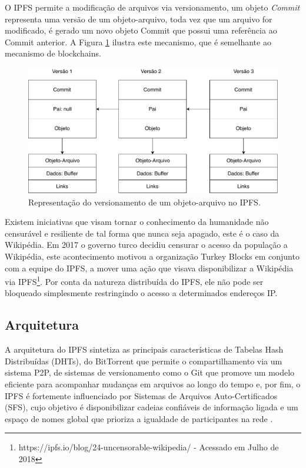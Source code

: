 \documentclass[tcc,capa]{texufpel}
\begin{document}
    O IPFS permite a modificação de arquivos via versionamento, um objeto \textit{Commit} representa uma versão de um objeto-arquivo, toda vez que um arquivo for modificado, é gerado um novo objeto Commit que possui uma referência ao Commit anterior. A Figura \ref{fig:representacao-commit-ipfs} ilustra este mecanismo, que é semelhante ao mecanismo de blockchains.
    
    \begin{figure}[h]
        \centering
        \includegraphics[width=16cm]{imagens/representacao-commit-ipfs.pdf}
        \caption{Representação do versionamento de um objeto-arquivo no IPFS.}
        \label{fig:representacao-commit-ipfs}
    \end{figure}
    
    Existem iniciativas que visam tornar o conhecimento da humanidade não censurável e resiliente de tal forma que nunca seja apagado, este é o caso da Wikipédia. Em 2017 o governo turco decidiu censurar o acesso da população a Wikipédia, este acontecimento motivou a organização Turkey Blocks em conjunto com a equipe do IPFS, a mover uma ação que visava disponibilizar a Wikipédia via IPFS\footnote{https://ipfs.io/blog/24-uncensorable-wikipedia/ - Acessado em Julho de 2018}. Por conta da natureza distribuída do IPFS, ele não pode ser bloqueado simplesmente restringindo o acesso a determinados endereços IP.

	\subsection{Arquitetura}
	    
        A arquitetura do IPFS sintetiza as principais características de Tabelas Hash Distribuídas (DHTs), do BitTorrent que permite o compartilhamento via um sistema P2P, de sistemas de versionamento como o Git que promove um modelo eficiente para acompanhar mudanças em arquivos ao longo do tempo e, por fim, o IPFS é fortemente influenciado por Sistemas de Arquivos Auto-Certificados (SFS), cujo objetivo é disponibilizar cadeias confiáveis de informação ligada e um espaço de nomes global que prioriza a igualdade de participantes na rede \cite{benet2014ipfs}.
        
\end{document}
